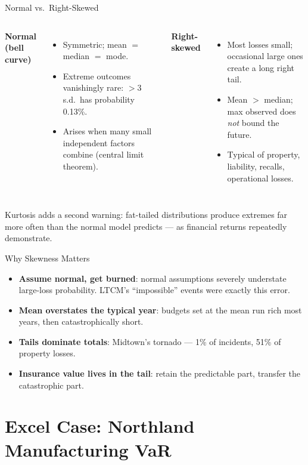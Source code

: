 \documentclass[11pt, aspectratio=169]{beamer}
\begin{document}
\begin{frame}{Normal vs.\ Right-Skewed}
\begin{columns}[T]
\textbf{Normal (bell curve)}
\begin{itemize}
  \item Symmetric; mean $=$ median $=$ mode.
  \item Extreme outcomes vanishingly rare: $>$3 s.d.\ has probability 0.13\%.
  \item Arises when many small independent factors combine (central limit theorem).
\end{itemize}
\textbf{Right-skewed}
\begin{itemize}
  \item Most losses small; occasional large ones create a long right tail.
  \item Mean $>$ median; max observed does \emph{not} bound the future.
  \item Typical of property, liability, recalls, operational losses.
\end{itemize}
\end{columns}
\medskip
\alert{Kurtosis} adds a second warning: fat-tailed distributions produce extremes far more often than the normal model predicts --- as financial returns repeatedly demonstrate.
\end{frame}

\begin{frame}{Why Skewness Matters}
\begin{itemize}
  \item \textbf{Assume normal, get burned}: normal assumptions severely understate large-loss probability. LTCM's ``impossible'' events were exactly this error.
  \item \textbf{Mean overstates the typical year}: budgets set at the mean run rich most years, then catastrophically short.
  \item \textbf{Tails dominate totals}: Midtown's tornado --- 1\% of incidents, 51\% of property losses.
  \item \textbf{Insurance value lives in the tail}: retain the predictable part, transfer the catastrophic part.
\end{itemize}
\end{frame}

\section{Excel Case: Northland Manufacturing VaR}
\end{document}
